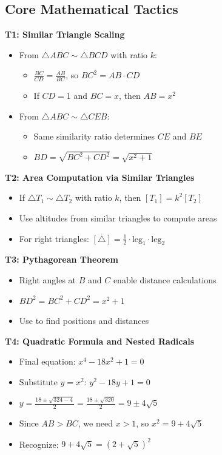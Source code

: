 \documentclass[]{article}
\begin{document}
\begin{tacticalbox}
\subsection*{Core Mathematical Tactics}

\textbf{T1: Similar Triangle Scaling}
\begin{itemize}[leftmargin=*]
    \item From $\triangle ABC \sim \triangle BCD$ with ratio $k$:
    \begin{itemize}
        \item $\frac{BC}{CD} = \frac{AB}{BC}$, so $BC^2 = AB \cdot CD$
        \item If $CD = 1$ and $BC = x$, then $AB = x^2$
    \end{itemize}
    \item From $\triangle ABC \sim \triangle CEB$:
    \begin{itemize}
        \item Same similarity ratio determines $CE$ and $BE$
        \item $BD = \sqrt{BC^2 + CD^2} = \sqrt{x^2 + 1}$
    \end{itemize}
\end{itemize}

\textbf{T2: Area Computation via Similar Triangles}
\begin{itemize}[leftmargin=*]
    \item If $\triangle T_1 \sim \triangle T_2$ with ratio $k$, then $[T_1] = k^2 [T_2]$
    \item Use altitudes from similar triangles to compute areas
    \item For right triangles: $[\triangle] = \frac{1}{2} \cdot \text{leg}_1 \cdot \text{leg}_2$
\end{itemize}

\textbf{T3: Pythagorean Theorem}
\begin{itemize}[leftmargin=*]
    \item Right angles at $B$ and $C$ enable distance calculations
    \item $BD^2 = BC^2 + CD^2 = x^2 + 1$
    \item Use to find positions and distances
\end{itemize}

\textbf{T4: Quadratic Formula and Nested Radicals}
\begin{itemize}[leftmargin=*]
    \item Final equation: $x^4 - 18x^2 + 1 = 0$
    \item Substitute $y = x^2$: $y^2 - 18y + 1 = 0$
    \item $y = \frac{18 \pm \sqrt{324 - 4}}{2} = \frac{18 \pm \sqrt{320}}{2} = 9 \pm 4\sqrt{5}$
    \item Since $AB > BC$, we need $x > 1$, so $x^2 = 9 + 4\sqrt{5}$
    \item Recognize: $9 + 4\sqrt{5} = (2 + \sqrt{5})^2$
\end{itemize}
\end{tacticalbox}
\end{document}
